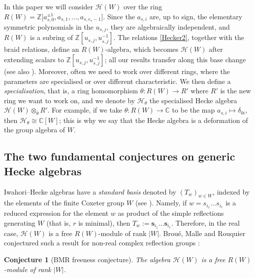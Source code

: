 \documentclass[11pt, reqno]{amsart}
\newcommand{\cH}{\mathcal{H}}
\numberwithin{equation}{section}
\newtheorem{conjecture}[theorem]{Conjecture}
\theoremstyle{remark}
\begin{document}
	
	
	
	
	In this paper we will consider $\cH(W)$  over the ring $R(W)=\mathbb Z\big[a_{s,0}^{\pm1}, a_{s,1},\dots,a_{s,e_s-1}\big]$. Since the $a_{s,i}$ are, up to sign, the elementary
	symmetric polynomials in the $u_{s,j}$, they are algebraically
	independent, and $R(W)$ is a subring of
	$\mathbb Z[u_{s,j},u_{s,j}^{-1}]$. The relations \eqref{Hecker2}, together with
	the braid relations, define an $R(W)$-algebra, which becomes $\cH(W)$
	after extending scalars to $\mathbb Z[u_{s,j},u_{s,j}^{-1}]$; all our
	results transfer along this base change (see also
	\cite[Proposition 2.3]{MarNew}).
	Moreover, often we need to work over different rings, where the parameters are specialised or over different characteristic. We then define a \emph{specialisation}, that is, a ring homomorphism $\theta: R(W) \rightarrow R'$ where $R'$ is the new ring we want to work on, and we denote by $\cH_\theta$ the specialised Hecke algebra $\cH(W)\otimes_{\theta} R'$.
	For example, if we take $\theta: R(W) \rightarrow \mathbb{C}$ to be the map $a_{s,i} \mapsto \delta_{0i}$,
	then $\cH_\theta \cong \mathbb{C}[W]$; this is why we say that the Hecke algebra is a deformation of the group algebra of $W$. 	
	
	
	\subsection{The two fundamental conjectures on generic Hecke algebras}\label{sec-2.2}
	
	Iwahori--Hecke algebras have a \emph{standard basis} denoted by $(T_w)_{w \in W}$, indexed by the elements of the finite Coxeter group $W$ (see \cite[IV, \S 2]{Bou05}). 
	Namely, if $w=s_{i_1}\ldots s_{i_r}$ is a reduced expression for the element $w$ as product of the simple reflections generating $W$ (that is, $r$ is minimal), then $T_w:={\mathbf{s}_{i_1}}\ldots {\mathbf{s}_{i_r}}$.
	Therefore, in the real case, $\cH(W)$ is a free $R(W)$-module of rank $|W|$. 
		Brou\'e, Malle and Rouquier conjectured such a result for non-real complex reflection groups \cite[\S 4]{BMR}:
	
	\begin{conjecture}[BMR freeness conjecture]
		The algebra $\cH(W)$ is a free $R(W)$-module of rank $|W|$. 
	\end{conjecture}
	
\end{document}
